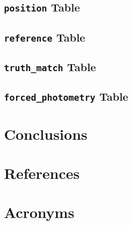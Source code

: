 \documentclass[DM,authoryear,toc]{lsstdoc}
\begin{document}


\subsection{\texttt{position} Table} \label{sec:position}



\subsection{\texttt{reference} Table} \label{sec:reference}



\subsection{\texttt{truth\_match} Table} \label{sec:truth_match}



\subsection{\texttt{forced\_photometry} Table} \label{sec:forced_photometry}



\section{Conclusions} \label{sec:conclusions}




\appendix
\section{References} \label{sec:bib}
\renewcommand{\refname}{} %


\section{Acronyms} \label{sec:acronyms}

\end{document}
